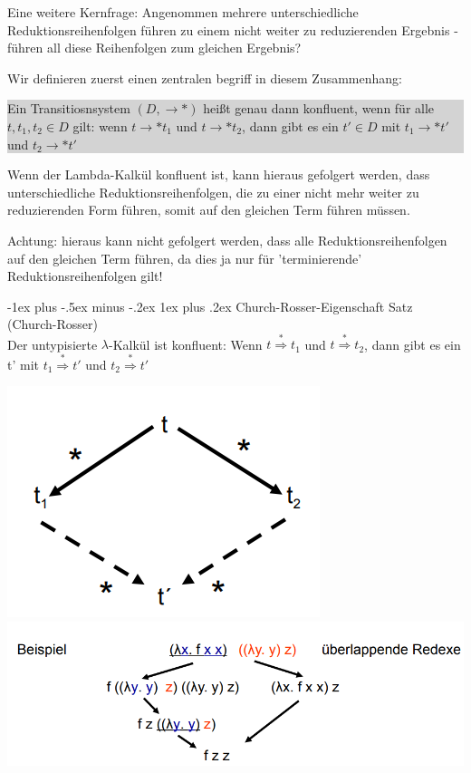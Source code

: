 \documentclass[10pt]{article}
\makeatletter
\renewcommand{\subsubsection}{\@startsection{subsubsection}{3}{0mm}%
                                {-1ex plus -.5ex minus -.2ex}%
                                {1ex plus .2ex}%
                                {\normalfont\small\bfseries}}
\makeatother
\begin{document}
\begin{itemize*}
\begin{itemize*}
  \end{itemize*}
  \item Eine weitere Kernfrage: Angenommen mehrere unterschiedliche Reduktionsreihenfolgen führen zu einem nicht weiter zu reduzierenden Ergebnis - \color{blue} führen all diese Reihenfolgen zum gleichen Ergebnis? \color{black}
  \item Wir definieren zuerst einen zentralen begriff in diesem Zusammenhang:
  \colorbox{lightgray}{\begin{minipage}[h]{1.0\linewidth}
      Ein Transitiosnsystem $(D,\rightarrow*)$ heißt genau dann konfluent, wenn für alle $t,t_1,t_2 \in D$ gilt: wenn  $ t \rightarrow* t_1$ und $t \rightarrow* t_2$, dann gibt es ein $t' \in D$ mit $t_1 \rightarrow* t'$ und $t_2 \rightarrow* t'$
    \end{minipage}}
  \item Wenn der Lambda-Kalkül konfluent ist, kann hieraus gefolgert werden, dass unterschiedliche Reduktionsreihenfolgen, die zu einer nicht mehr weiter zu reduzierenden Form führen, somit auf den gleichen Term führen müssen.
  \item Achtung: hieraus kann nicht gefolgert werden, dass alle Reduktionsreihenfolgen auf den gleichen Term führen, da dies ja nur für 'terminierende' Reduktionsreihenfolgen gilt!
\end{itemize*}

\subsubsection{Church-Rosser-Eigenschaft}
\color{blue} Satz (Church-Rosser) \\
Der untypisierte $\lambda$-Kalkül ist konfluent: Wenn $t \stackrel{*}{\Rightarrow} t_1$ und $t \stackrel{*}{\Rightarrow} t_2$, dann gibt es ein t' mit $t_1 \stackrel{*}{\Rightarrow} t'$ und $t_2 \stackrel{*}{\Rightarrow} t'$
\color{black}

\begin{center}
  \includegraphics[width=0.25\linewidth]{Assets/Programmierparadigmen-diamant-eigenschaft.png}
  \includegraphics[width=0.25\linewidth]{Assets/Programmierparadigmen-diamant-beispiel}
\end{center}
\end{document}
